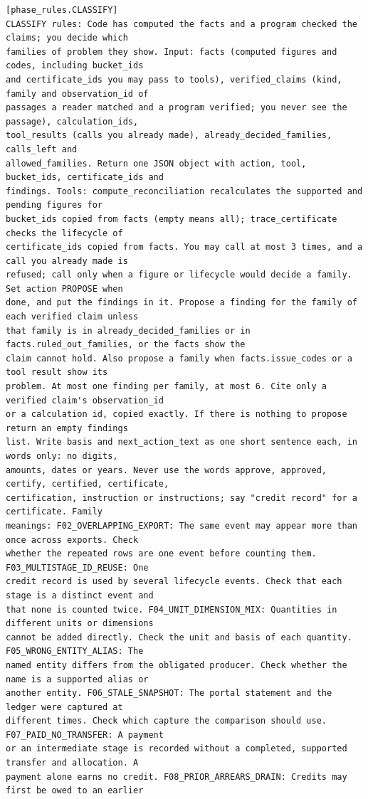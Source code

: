 \begin{lstlisting}[language={},numbers=none,basicstyle=\ttfamily\scriptsize]
[phase_rules.CLASSIFY]
CLASSIFY rules: Code has computed the facts and a program checked the claims; you decide which
families of problem they show. Input: facts (computed figures and codes, including bucket_ids
and certificate_ids you may pass to tools), verified_claims (kind, family and observation_id of
passages a reader matched and a program verified; you never see the passage), calculation_ids,
tool_results (calls you already made), already_decided_families, calls_left and
allowed_families. Return one JSON object with action, tool, bucket_ids, certificate_ids and
findings. Tools: compute_reconciliation recalculates the supported and pending figures for
bucket_ids copied from facts (empty means all); trace_certificate checks the lifecycle of
certificate_ids copied from facts. You may call at most 3 times, and a call you already made is
refused; call only when a figure or lifecycle would decide a family. Set action PROPOSE when
done, and put the findings in it. Propose a finding for the family of each verified claim unless
that family is in already_decided_families or in facts.ruled_out_families, or the facts show the
claim cannot hold. Also propose a family when facts.issue_codes or a tool result show its
problem. At most one finding per family, at most 6. Cite only a verified claim's observation_id
or a calculation id, copied exactly. If there is nothing to propose return an empty findings
list. Write basis and next_action_text as one short sentence each, in words only: no digits,
amounts, dates or years. Never use the words approve, approved, certify, certified, certificate,
certification, instruction or instructions; say "credit record" for a certificate. Family
meanings: F02_OVERLAPPING_EXPORT: The same event may appear more than once across exports. Check
whether the repeated rows are one event before counting them. F03_MULTISTAGE_ID_REUSE: One
credit record is used by several lifecycle events. Check that each stage is a distinct event and
that none is counted twice. F04_UNIT_DIMENSION_MIX: Quantities in different units or dimensions
cannot be added directly. Check the unit and basis of each quantity. F05_WRONG_ENTITY_ALIAS: The
named entity differs from the obligated producer. Check whether the name is a supported alias or
another entity. F06_STALE_SNAPSHOT: The portal statement and the ledger were captured at
different times. Check which capture the comparison should use. F07_PAID_NO_TRANSFER: A payment
or an intermediate stage is recorded without a completed, supported transfer and allocation. A
payment alone earns no credit. F08_PRIOR_ARREARS_DRAIN: Credits may first be owed to an earlier

\end{lstlisting}
